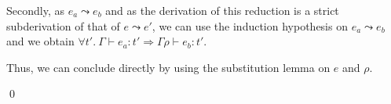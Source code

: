 \documentclass[a4paper]{article}
\theoremstyle{definition}
\begin{document}
\begin{description}
\begin{itemize}
            Secondly, as $e_a\leadsto e_b$ and as the derivation of this reduction is a strict subderivation of that of $e\leadsto e'$,
            we can use the induction hypothesis on $e_a\leadsto e_b$ and we obtain $\forall t'.\ \Gamma \vdash e_a : t' \Rightarrow \Gamma\rho \vdash e_b:t'$.
            
            Thus, we can conclude directly by using the substitution lemma on $e$ and $\rho$.
          \end{itemize}
        \end{description}
        \qed
\end{document}
